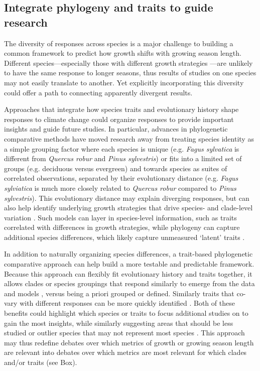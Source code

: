 \documentclass[11pt]{article}
\begin{document}
\subsection*{Integrate phylogeny and traits to guide research}

The diversity of responses across species is a major challenge to building a common framework to predict how growth shifts with growing season length. Different species---especially those with different growth strategies \citep{Grime:1977sw}---are unlikely to have the same response to longer seasons, thus results of studies on one species may not easily translate to another. Yet explicitly incorporating this diversity could offer a path to connecting apparently divergent results. 

Approaches that integrate how species traits and evolutionary history shape responses to climate change  \citep{cornwell2017phylogenetic,harmonebook} could organize responses to provide important insights and guide future studies. In particular, advances in phylogenetic comparative methods \citep{Webb:2002or} have moved research away from treating species identity as a simple grouping factor where each species is unique (e.g. \emph{Fagus sylvatica} is different from \emph{Quercus robur} and \emph{Pinus sylvestris}) or fits into a limited set of groups (e.g. deciduous versus evergreen) and towards species as suites of correlated observations, separated by their evolutionary distance (e.g. \emph{Fagus sylviatica} is much more closely related to \emph{Quercus robur} compared to \emph{Pinus sylvestris}). This evolutionary distance may explain diverging responses, but can also help identify underlying growth strategies that drive species- and clade-level variation \citep[][]{pearse2019interaction,morales2024phylogenetic}. Such models can layer in species-level information, such as traits correlated with differences in growth strategies, while phylogeny can capture additional species differences, which likely capture unmeasured `latent' traits . 

In addition to naturally organizing species differences, a trait-based phylogenetic comparative approach can help build a more testable and predictable framework. Because this approach can flexibly fit evolutionary history and traits together, it allows clades or species groupings that respond similarly to emerge from the data and models \citep{davies2019phylogenetically}, versus being a priori grouped or defined. Similarly traits that co-vary with different responses can be more quickly identified \citep[e.g.][see Fig. 4]{willis2008phylogenetic,davies2019phylogenetically}. Both of these benefits could highlight which species or traits to focus additional studies on to gain the most insights, while similarly suggesting areas that should be less studied \citep[e.g. traits that may be too confounded with evolutionary history,][]{cornwell2014functional,westoby2023phylogenetically} or outlier species that may not represent most species \citep{morales2024phylogenetic}. This approach may thus redefine debates over which metrics of growth or growing season length are relevant into debates over which metrics are most relevant for which clades and/or traits (see Box). 
\end{document}

